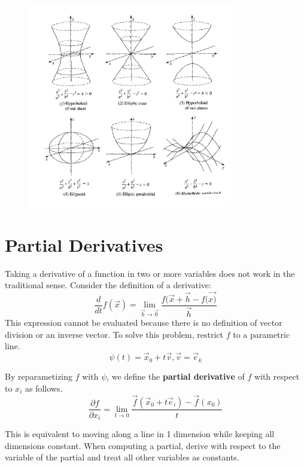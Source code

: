 \documentclass[11pt]{article}
\begin{document}
	\begin{figure}[htb]
		\centering
		\includegraphics[width=0.8\textwidth]{quadric.png}
		\label{fig:quadric}
	\end{figure}
	
\section{Partial Derivatives}
	Taking a derivative of a function in two or more variables does not work in the traditional sense. Consider the definition of a derivative:
	\begin{equation}
		\frac{d}{dt}f(\vec{x}) = \lim_{\vec{h}\rightarrow\vec{0}} \frac{f(\vec{x}+\vec{h} - f(\vec{x)}}{\vec{h}}
	\end{equation}
	This expression cannot be evaluated because there is no definition of vector division or an inverse vector. To solve this problem, restrict $f$ to a parametric line.
	\begin{equation}
		\psi(t) = \vec{x}_0 + t\vec{v}, \vec{v} = \vec{e}_k
	\end{equation}
	
	By reparametizing $f$ with $\psi$, we define the \textbf{partial derivative} of $f$ with respect to $x_i$ as follows.
	\begin{equation}
		\frac{\partial f}{\partial x_i} = \lim_{t\rightarrow 0}\frac{\vec{f}(\vec{x}_0 + t\vec{e}_i) - \vec{f}(x_0)}{t}
	\end{equation}
	
	This is equivalent to moving along a line in 1 dimension while keeping all dimensions constant. When computing a partial, derive with respect to the variable of the partial and treat all other variables as constants.
		
\end{document}

